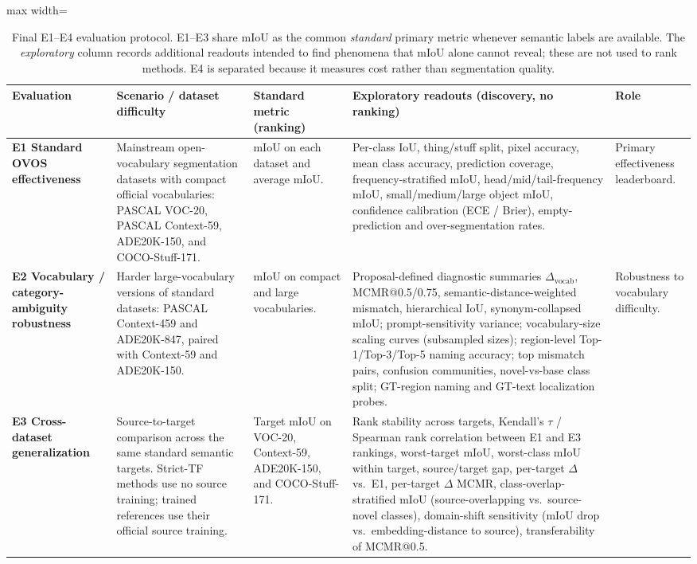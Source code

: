 \documentclass[11pt,a4paper]{article}
\begin{document}
\begin{table}[!htbp]
\centering
\small
\caption{Final E1--E4 evaluation protocol. E1--E3 share mIoU as the common \emph{standard} primary metric whenever semantic labels are available. The \emph{exploratory} column records additional readouts intended to find phenomena that mIoU alone cannot reveal; these are not used to rank methods. E4 is separated because it measures cost rather than segmentation quality.}
\label{tab:evaluation-overview}
\setlength{\tabcolsep}{3pt}
\begin{adjustbox}{max width=\textwidth}
\begin{tabular}{p{} p{} p{} p{} p{}}
\toprule
Evaluation & Scenario / dataset difficulty & Standard metric (ranking) & Exploratory readouts (discovery, no ranking) & Role \\
\midrule
\textbf{E1 Standard OVOS effectiveness} &
Mainstream open-vocabulary segmentation datasets with compact official vocabularies: PASCAL VOC-20, PASCAL Context-59, ADE20K-150, and COCO-Stuff-171. &
mIoU on each dataset and average mIoU. &
Per-class IoU, thing/stuff split, pixel accuracy, mean class accuracy, prediction coverage, frequency-stratified mIoU, head/mid/tail-frequency mIoU, small/medium/large object mIoU, confidence calibration (ECE / Brier), empty-prediction and over-segmentation rates. &
Primary effectiveness leaderboard. \\
\addlinespace[2pt]
\textbf{E2 Vocabulary / category-ambiguity robustness} &
Harder large-vocabulary versions of standard datasets: PASCAL Context-459 and ADE20K-847, paired with Context-59 and ADE20K-150. &
mIoU on compact and large vocabularies. &
Proposal-defined diagnostic summaries $\Delta_{\mathrm{vocab}}$, MCMR@0.5/0.75, semantic-distance-weighted mismatch, hierarchical IoU, synonym-collapsed mIoU; prompt-sensitivity variance; vocabulary-size scaling curves (subsampled sizes); region-level Top-1/Top-3/Top-5 naming accuracy; top mismatch pairs, confusion communities, novel-vs-base class split; GT-region naming and GT-text localization probes. &
Robustness to vocabulary difficulty. \\
\addlinespace[2pt]
\textbf{E3 Cross-dataset generalization} &
Source-to-target comparison across the same standard semantic targets. Strict-TF methods use no source training; trained references use their official source training. &
Target mIoU on VOC-20, Context-59, ADE20K-150, and COCO-Stuff-171. &
Rank stability across targets, Kendall's $\tau$ / Spearman rank correlation between E1 and E3 rankings, worst-target mIoU, worst-class mIoU within target, source/target gap, per-target $\Delta$ vs.\ E1, per-target $\Delta$ MCMR, class-overlap-stratified mIoU (source-overlapping vs.\ source-novel classes), domain-shift sensitivity (mIoU drop vs.\ embedding-distance to source), transferability of MCMR@0.5. &

\end{tabular}
\end{adjustbox}
\end{table}
\end{document}
